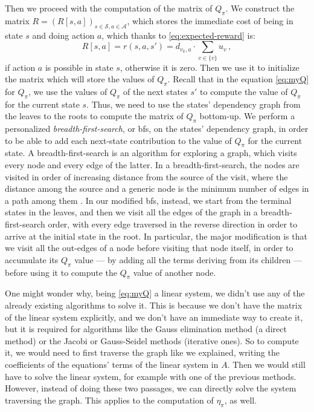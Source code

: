 Then we proceed with the computation of the matrix of $Q_\pi$. We construct the matrix $R = (R[s,a])_{s \in \mathcal S, a \in \mathcal A}$, which stores the immediate cost of being in state $s$ and doing action $a$, which thanks to \eqref{eq:expected-reward} is:
\begin{equation}
    R[s,a] = r(s,a,s') = d_{v_k, a} \cdot \sum_{v \in \{v\}} u_v \, ,
\end{equation}
if action $a$ is possible in state $s$, otherwise it is zero. Then we use it to initialize the matrix which will store the values of $Q_\pi$. Recall that in the equation \eqref{eq:myQ} for $Q_\pi$, we use the values of $Q_\pi$ of the next states $s'$ to compute the value of $Q_\pi$ for the current state $s$. Thus, we need to use the states' dependency graph from the leaves to the roots to compute the matrix of $Q_\pi$ bottom-up. We perform a personalized \emph{breadth-first-search}, or \acrshort{bfs}, on the states' dependency graph, in order to be able to add each next-state contribution to the value of $Q_\pi$ for the current state. A breadth-first-search is an algorithm for exploring a graph, which visits every node and every edge of the latter. In a breadth-first-search, the nodes are visited in order of increasing distance from the source of the visit, where the distance among the source and a generic node is the minimum number of edges in a path among them \cite{Montresor2014}. In our modified \acrshort{bfs}, instead, we start from the terminal states in the leaves, and then we visit all the edges of the graph in a breadth-first-search order, with every edge traversed in the reverse direction in order to arrive at the initial state in the root. In particular, the major modification is that we visit all the out-edges of a node before visiting that node itself, in order to accumulate its $Q_\pi$ value --- by adding all the terms deriving from its children --- before using it to compute the $Q_\pi$ value of another node.

One might wonder why, being \eqref{eq:myQ} a linear system, we didn't use any of the already existing algorithms to solve it. This is because we don't have the matrix of the linear system explicitly, and we don't have an immediate way to create it, but it is required for algorithms like the Gauss elimination method (a direct method) or the Jacobi or Gauss-Seidel methods (iterative ones). So to compute it, we would need to first traverse the graph like we explained, writing the coefficients of the equations' terms of the linear system in $A$. Then we would still have to solve the linear system, for example with one of the previous methods. However, instead of doing these two passages, we can directly solve the system traversing the graph. This applies to the computation of $\eta_\pi$, as well.

